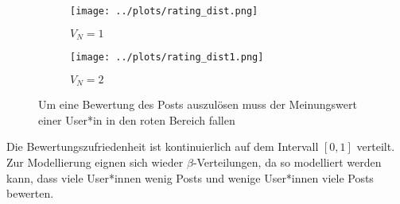 \begin{figure}
	\begin{subfigure}{0.5\textwidth}
		\texttt{[image: ../plots/rating\_dist.png]}
		\caption{$V_N = 1$}
	\end{subfigure}
	\begin{subfigure}{0.5\textwidth}
		\texttt{[image: ../plots/rating\_dist1.png]}
		\caption{$V_N = 2$}
	\end{subfigure}
	\caption{Um eine Bewertung des Posts auszulösen muss der Meinungswert einer User*in in den roten Bereich fallen}
	\label{fig:bewzuf}
\end{figure}


Die Bewertungszufriedenheit ist kontinuierlich auf dem Intervall $[0,1]$ verteilt. Zur Modellierung eignen sich wieder $\beta$-Verteilungen, da so modelliert werden kann, dass viele User*innen wenig Posts und wenige User*innen viele Posts bewerten.








